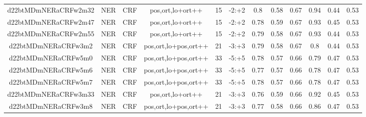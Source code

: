 \documentclass[a4paper]{article}
\begin{document}
\begin{landscape}
\begin{center}
\begin{tabular}{ |c|c|c|c|c|c|c|c|c|c|c|c|}
 
 	
 	\small{ d22btMDmNERaCRFw2m32 } & \small{ NER} & \small{  CRF }  & pos,ort,lo+ort++  &  15 &  \small{  -2:+2 }  &  0.8 & 0.58 & 0.67  &  0.94 & 0.44 & 0.53 \\
 	

 
 	
 	\small{ d22btMDmNERaCRFw2m47 } & \small{ NER} & \small{  CRF }  & pos,ort,lo+ort++  &  15 &  \small{  -2:+2 }  &  0.78 & 0.59 & 0.67  &  0.93 & 0.45 & 0.53 \\
 	

 
 	
 	\small{ d22btMDmNERaCRFw2m55 } & \small{ NER} & \small{  CRF }  & pos,ort,lo+ort++  &  15 &  \small{  -2:+2 }  &  0.79 & 0.58 & 0.67  &  0.93 & 0.44 & 0.53 \\
 	

 
 	
 	\small{ d22btMDmNERaCRFw3m2 } & \small{ NER} & \small{  CRF }  & pos,ort,lo+pos,ort++  &  21 &  \small{  -3:+3 }  &  0.79 & 0.58 & 0.67  &  0.8 & 0.44 & 0.53 \\
 	

 
 	
 	\small{ d22btMDmNERaCRFw5m0 } & \small{ NER} & \small{  CRF }  & pos,ort,lo+pos,ort++  &  33 &  \small{  -5:+5 }  &  0.78 & 0.57 & 0.66  &  0.79 & 0.47 & 0.53 \\
 	

 
 	
 	\small{ d22btMDmNERaCRFw5m6 } & \small{ NER} & \small{  CRF }  & pos,ort,lo+pos,ort++  &  33 &  \small{  -5:+5 }  &  0.77 & 0.57 & 0.66  &  0.78 & 0.47 & 0.53 \\
 	

 
 	
 	\small{ d22btMDmNERaCRFw5m7 } & \small{ NER} & \small{  CRF }  & pos,ort,lo+pos,ort++  &  33 &  \small{  -5:+5 }  &  0.78 & 0.57 & 0.66  &  0.78 & 0.47 & 0.53 \\
 	

 
 	
 	\small{ d22btMDmNERaCRFw3m33 } & \small{ NER} & \small{  CRF }  & pos,ort,lo+ort++  &  21 &  \small{  -3:+3 }  &  0.76 & 0.59 & 0.66  &  0.92 & 0.45 & 0.53 \\
 	

 
 	
 	\small{ d22btMDmNERaCRFw3m8 } & \small{ NER} & \small{  CRF }  & pos,ort,lo+pos,ort++  &  21 &  \small{  -3:+3 }  &  0.77 & 0.58 & 0.66  &  0.86 & 0.47 & 0.53 \\
 	


\end{tabular}
\end{center}
\end{landscape}
\end{document}
